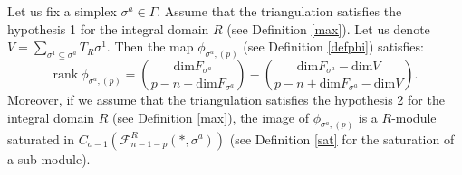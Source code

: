 \documentclass[10pt,a4paper]{amsart}
\begin{document}
\begin{proposition}
    Let us fix a simplex $\sigma^a \in \Gamma$. Assume that the triangulation satisfies the hypothesis 1 for the integral domain $R$ (see Definition \ref{max}). Let us denote $V=\sum_{\sigma^1 \subseteq \sigma^a}T_R \sigma^1$. Then the map $\phi_{\sigma^{a},(p)}$ (see Definition \ref{defphi}) satisfies:
    \begin{equation*}
        \mathrm{rank} ~ \phi_{\sigma^{a},(p)} =\binom{\mathrm{dim}F_{\sigma^a}}{p-n+\mathrm{dim}F_{\sigma^a}}-\binom{\mathrm{dim}F_{\sigma^a}-\mathrm{dim}V}{p-n+\mathrm{dim}F_{\sigma^a}-\mathrm{dim}V}.
    \end{equation*}
    Moreover, if we assume that the triangulation satisfies the hypothesis 2 for the integral domain $R$ (see Definition \ref{max}), the image of $\phi_{\sigma^{a},(p)}$ is a $R$-module saturated in $C_{a-1}(\mathcal{F}_{n-1-p}^R(*,\sigma^a))$ (see Definition \ref{sat} for the saturation of a sub-module).
    \label{ranphi}
\end{proposition}
\end{document}
